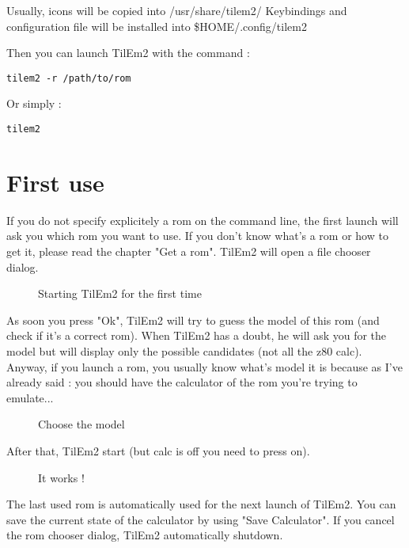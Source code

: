 \documentclass[10pt]{report}
\begin{document}
Usually, icons will be copied into /usr/share/tilem2/\newline
Keybindings and configuration file will be installed into \$HOME/.config/tilem2\newline

Then you can launch TilEm2 with the command :\newline
\begin{lstlisting}
tilem2 -r /path/to/rom
\end{lstlisting}

Or simply :\newline
\begin{lstlisting}
tilem2
\end{lstlisting}

\section{First use}
If you do not specify explicitely a rom on the command line, the first launch will ask you which rom you want to use.\newline
If you don't know what's a rom or how to get it, please read the chapter "Get a rom".\newline
TilEm2 will open a file chooser dialog.\newline

\begin{figure}[H]
\centering
{}
\caption{Starting TilEm2 for the first time}
\end{figure}

As soon you press "Ok", TilEm2 will try to guess the model of this rom (and check if it's a correct rom).\newline
When TilEm2 has a doubt, he will ask you for the model but will display only the possible candidates (not all the z80 calc).\newline
Anyway, if you launch a rom, you usually know what's model it is because as I've already said : you should have the calculator of the rom you're trying to emulate...\newline

\begin{figure}[H]
\centering
{}
\caption{Choose the model}
\end{figure}

After that, TilEm2 start (but calc is off you need to press on).\newline
\begin{figure}[H]
\centering
{}
\caption{It works !}
\end{figure}
The last used rom is automatically used for the next launch of TilEm2.\newline
You can save the current state of the calculator by using "Save Calculator".\newline
If you cancel the rom chooser dialog, TilEm2 automatically shutdown.\newline
\end{document}
